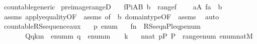 \begin{isabellebody}
\isanewline
{}\isamarkupfalse%
\ countable{\isacharunderscore}{\kern0pt}generic\isanewline
{}\isanewline
\isanewline
{}\isamarkupfalse%
\ preimage{\isacharunderscore}{\kern0pt}rangeD{\isacharcolon}{\kern0pt}\isanewline
\ \ \ {\isachardoublequoteopen}f{\isasymin}Pi{\isacharparenleft}{\kern0pt}A{\isacharcomma}{\kern0pt}B{\isacharparenright}{\kern0pt}{\isachardoublequoteclose}\ {\isachardoublequoteopen}b\ {\isasymin}\ range{\isacharparenleft}{\kern0pt}f{\isacharparenright}{\kern0pt}{\isachardoublequoteclose}\ \isanewline
\ \ \ {\isachardoublequoteopen}{\isasymexists}a{\isasymin}A{\isachardot}{\kern0pt}\ f{\isacharbackquote}{\kern0pt}a\ {\isacharequal}{\kern0pt}\ b{\isachardoublequoteclose}\isanewline
%
\isadelimproof
\ \ %
\endisadelimproof
%
\isatagproof
{}\isamarkupfalse%
\ assms\ apply{\isacharunderscore}{\kern0pt}equality{\isacharbrackleft}{\kern0pt}OF\ {\isacharunderscore}{\kern0pt}\ assms{\isacharparenleft}{\kern0pt}{}{\isacharparenright}{\kern0pt}{\isacharcomma}{\kern0pt}\ of\ {\isacharunderscore}{\kern0pt}\ b{\isacharbrackright}{\kern0pt}\ domain{\isacharunderscore}{\kern0pt}type{\isacharbrackleft}{\kern0pt}OF\ {\isacharunderscore}{\kern0pt}\ assms{\isacharparenleft}{\kern0pt}{}{\isacharparenright}{\kern0pt}{\isacharbrackright}{\kern0pt}\ \isamarkupfalse%
\ auto%
\endisatagproof
{\isafoldproof}%
%
\isadelimproof
\isanewline
%
\endisadelimproof
\isanewline
{}\isamarkupfalse%
\ countable{\isacharunderscore}{\kern0pt}RS{\isacharunderscore}{\kern0pt}sequence{\isacharunderscore}{\kern0pt}aux{\isacharcolon}{\kern0pt}\isanewline
\ \ \ p\ enum\isanewline
\ \ \ {\isachardoublequoteopen}f{\isacharparenleft}{\kern0pt}n{\isacharparenright}{\kern0pt}\ {\isasymequiv}\ RS{\isacharunderscore}{\kern0pt}seq{\isacharparenleft}{\kern0pt}n{\isacharcomma}{\kern0pt}P{\isacharcomma}{\kern0pt}leq{\isacharcomma}{\kern0pt}p{\isacharcomma}{\kern0pt}enum{\isacharcomma}{\kern0pt}{\isasymD}{\isacharparenright}{\kern0pt}{\isachardoublequoteclose}\isanewline
\ \ \ \ \ \ \ {\isachardoublequoteopen}Q{\isacharparenleft}{\kern0pt}q{\isacharcomma}{\kern0pt}k{\isacharcomma}{\kern0pt}m{\isacharparenright}{\kern0pt}\ {\isasymequiv}\ enum{\isacharbackquote}{\kern0pt}m{\isasympreceq}\ q\ {\isasymand}\ enum{\isacharbackquote}{\kern0pt}m\ {\isasymin}\ {\isasymD}\ {\isacharbackquote}{\kern0pt}\ k{\isachardoublequoteclose}\isanewline
\ \ \ {\isachardoublequoteopen}n{\isasymin}nat{\isachardoublequoteclose}\ {\isachardoublequoteopen}p{\isasymin}P{\isachardoublequoteclose}\ {\isachardoublequoteopen}P\ {\isasymsubseteq}\ range{\isacharparenleft}{\kern0pt}enum{\isacharparenright}{\kern0pt}{\isachardoublequoteclose}\ {\isachardoublequoteopen}enum{\isacharcolon}{\kern0pt}nat{\isasymrightarrow}M{\isachardoublequoteclose}\isanewline

\end{isabellebody}
